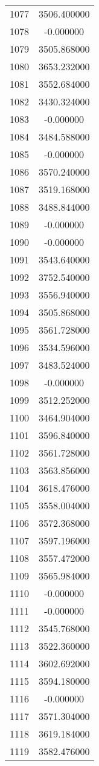 \documentclass[12pt]{article}
\begin{document}
\begin{longtable}{@{}cc@{}}
1077 & 3506.400000 \\
1078 & -0.000000 \\
1079 & 3505.868000 \\
1080 & 3653.232000 \\
1081 & 3552.684000 \\
1082 & 3430.324000 \\
1083 & -0.000000 \\
1084 & 3484.588000 \\
1085 & -0.000000 \\
1086 & 3570.240000 \\
1087 & 3519.168000 \\
1088 & 3488.844000 \\
1089 & -0.000000 \\
1090 & -0.000000 \\
1091 & 3543.640000 \\
1092 & 3752.540000 \\
1093 & 3556.940000 \\
1094 & 3505.868000 \\
1095 & 3561.728000 \\
1096 & 3534.596000 \\
1097 & 3483.524000 \\
1098 & -0.000000 \\
1099 & 3512.252000 \\
1100 & 3464.904000 \\
1101 & 3596.840000 \\
1102 & 3561.728000 \\
1103 & 3563.856000 \\
1104 & 3618.476000 \\
1105 & 3558.004000 \\
1106 & 3572.368000 \\
1107 & 3597.196000 \\
1108 & 3557.472000 \\
1109 & 3565.984000 \\
1110 & -0.000000 \\
1111 & -0.000000 \\
1112 & 3545.768000 \\
1113 & 3522.360000 \\
1114 & 3602.692000 \\
1115 & 3594.180000 \\
1116 & -0.000000 \\
1117 & 3571.304000 \\
1118 & 3619.184000 \\
1119 & 3582.476000 \\

\end{longtable}
\end{document}
